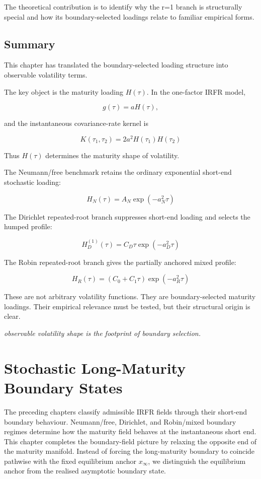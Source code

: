 \documentclass[11pt,oneside]{book}
\begin{document}
The theoretical contribution is to identify why the r=1 branch is
structurally special and how its boundary-selected loadings relate to
familiar empirical forms.

\section{Summary}\label{summary-6}

This chapter has translated the boundary-selected loading structure into
observable volatility terms.

The key object is the maturity loading $H(\tau)$. In the one-factor IRFR
model,

\[
g(\tau) = aH(\tau),
\]

and the instantaneous covariance-rate kernel is

\[
K(\tau_1,\tau_2) = 2a^2H(\tau_1)H(\tau_2)
\]

Thus $H(\tau)$ determines the maturity shape of volatility.

The Neumann/free benchmark retains the ordinary exponential short-end
stochastic loading:

\[
H_N(\tau) = A_N \exp(-a_N^2\tau)
\]

The Dirichlet repeated-root branch suppresses short-end loading and
selects the humped profile:

\[
H_D^{(1)}(\tau) = C_D \tau \exp(-a_D^2\tau)
\]

The Robin repeated-root branch gives the partially anchored mixed
profile:

\[
H_R(\tau) = (C_0 + C_1\tau) \exp(-a_R^2\tau)
\]

These are not arbitrary volatility functions. They are boundary-selected
maturity loadings. Their empirical relevance must be tested, but their
structural origin is clear.

\emph{observable volatility shape is the footprint of boundary
selection.}

\chapter{Stochastic Long-Maturity Boundary States}
\label{ch:stochastic-long-boundary}

The preceding chapters classify admissible IRFR fields through their short-end boundary behaviour. Neumann/free, Dirichlet, and Robin/mixed boundary regimes determine how the maturity field behaves at the instantaneous short end. This chapter completes the boundary-field picture by relaxing the opposite end of the maturity manifold. Instead of forcing the long-maturity boundary to coincide pathwise with the fixed equilibrium anchor \(x_\infty\), we distinguish the equilibrium anchor from the realised asymptotic boundary state.
\end{document}
